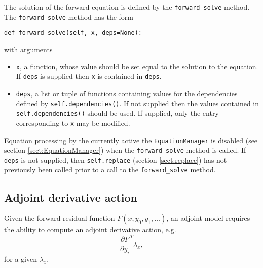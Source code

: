 \documentclass[11pt]{article}
\begin{document}
The solution of the forward equation is defined by the \texttt{forward\_solve}
method. The \texttt{forward\_solve} method has the form
\begin{lstlisting}
def forward_solve(self, x, deps=None):
\end{lstlisting}
with arguments
\begin{itemize}
  \item \texttt{x}, a function, whose value should be set equal to the solution
    to the equation. If \texttt{deps} is supplied then \texttt{x} is contained
    in \texttt{deps}.
  \item \texttt{deps}, a list or tuple of functions containing values for the
    dependencies defined by \texttt{self.dependencies()}. If not supplied then
    the values contained in \texttt{self.dependencies()} should be used. If
    supplied, only the entry corresponding to \texttt{x} may be modified.
\end{itemize}

Equation processing by the currently active the \texttt{EquationManager} is
disabled (see section \ref{sect:EquationManager}) when the
\texttt{forward\_solve} method is called. If \texttt{deps} is not supplied,
then \texttt{self.replace} (section \ref{sect:replace}) has not previously been
called prior to a call to the \texttt{forward\_solve} method.

\subsection{Adjoint derivative action}\label{sect:adjoint_derivative_action}

Given the forward residual function $F \left( x, y_0, y_1, \ldots \right)$, an
adjoint model requires the ability to compute an adjoint derivative action,
e.g.
\begin{equation*}
  \frac{\partial F}{\partial y_i}^T \lambda_x,
\end{equation*}
for a given $\lambda_x$.
\end{document}
